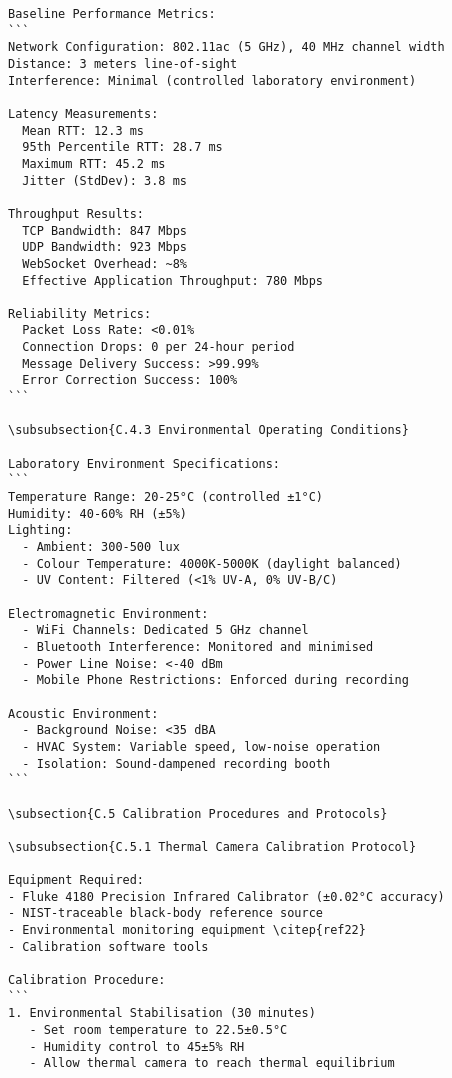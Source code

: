 \begin{verbatim}
Baseline Performance Metrics:
```
Network Configuration: 802.11ac (5 GHz), 40 MHz channel width
Distance: 3 meters line-of-sight
Interference: Minimal (controlled laboratory environment)

Latency Measurements:
  Mean RTT: 12.3 ms
  95th Percentile RTT: 28.7 ms
  Maximum RTT: 45.2 ms
  Jitter (StdDev): 3.8 ms

Throughput Results:
  TCP Bandwidth: 847 Mbps
  UDP Bandwidth: 923 Mbps
  WebSocket Overhead: ~8%
  Effective Application Throughput: 780 Mbps

Reliability Metrics:
  Packet Loss Rate: <0.01%
  Connection Drops: 0 per 24-hour period
  Message Delivery Success: >99.99%
  Error Correction Success: 100%
```

\subsubsection{C.4.3 Environmental Operating Conditions}

Laboratory Environment Specifications:
```
Temperature Range: 20-25°C (controlled ±1°C)
Humidity: 40-60% RH (±5%)
Lighting:
  - Ambient: 300-500 lux
  - Colour Temperature: 4000K-5000K (daylight balanced)
  - UV Content: Filtered (<1% UV-A, 0% UV-B/C)

Electromagnetic Environment:
  - WiFi Channels: Dedicated 5 GHz channel
  - Bluetooth Interference: Monitored and minimised
  - Power Line Noise: <-40 dBm
  - Mobile Phone Restrictions: Enforced during recording

Acoustic Environment:
  - Background Noise: <35 dBA
  - HVAC System: Variable speed, low-noise operation
  - Isolation: Sound-dampened recording booth
```

\subsection{C.5 Calibration Procedures and Protocols}

\subsubsection{C.5.1 Thermal Camera Calibration Protocol}

Equipment Required:
- Fluke 4180 Precision Infrared Calibrator (±0.02°C accuracy)
- NIST-traceable black-body reference source
- Environmental monitoring equipment \citep{ref22}
- Calibration software tools

Calibration Procedure:
```
1. Environmental Stabilisation (30 minutes)
   - Set room temperature to 22.5±0.5°C
   - Humidity control to 45±5% RH
   - Allow thermal camera to reach thermal equilibrium


\end{verbatim}
